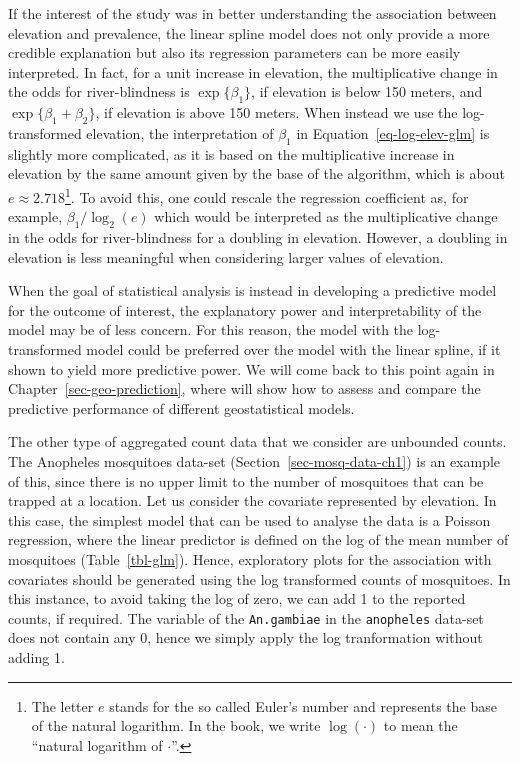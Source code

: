 \documentclass[
  letterpaper,
]{krantz}
\begin{document}
If the interest of the study was in better understanding the association
between elevation and prevalence, the linear spline model does not only
provide a more credible explanation but also its regression parameters
can be more easily interpreted. In fact, for a unit increase in
elevation, the multiplicative change in the odds for river-blindness is
\(\exp\{\beta_1\}\), if elevation is below 150 meters, and
\(\exp\{\beta_1+\beta_2\}\), if elevation is above 150 meters. When
instead we use the log-transformed elevation, the interpretation of
\(\beta_1\) in Equation~\ref{eq-log-elev-glm} is slightly more
complicated, as it is based on the multiplicative increase in elevation
by the same amount given by the base of the algorithm, which is about
\(e \approx 2.718\)\footnote{The letter \(e\) stands for the so called
  Euler's number and represents the base of the natural logarithm. In
  the book, we write \(\log(\cdot)\) to mean the ``natural logarithm of
  \(\cdot\)''.}. To avoid this, one could rescale the regression
coefficient as, for example, \(\beta_1/\log_{2}(e)\) which would be
interpreted as the multiplicative change in the odds for river-blindness
for a doubling in elevation. However, a doubling in elevation is less
meaningful when considering larger values of elevation.

When the goal of statistical analysis is instead in developing a
predictive model for the outcome of interest, the explanatory power and
interpretability of the model may be of less concern. For this reason,
the model with the log-transformed model could be preferred over the
model with the linear spline, if it shown to yield more predictive
power. We will come back to this point again in
Chapter~\ref{sec-geo-prediction}, where will show how to assess and
compare the predictive performance of different geostatistical models.

The other type of aggregated count data that we consider are unbounded
counts. The Anopheles mosquitoes data-set
(Section~\ref{sec-mosq-data-ch1}) is an example of this, since there is
no upper limit to the number of mosquitoes that can be trapped at a
location. Let us consider the covariate represented by elevation. In
this case, the simplest model that can be used to analyse the data is a
Poisson regression, where the linear predictor is defined on the log of
the mean number of mosquitoes (Table~\ref{tbl-glm}). Hence, exploratory
plots for the association with covariates should be generated using the
log transformed counts of mosquitoes. In this instance, to avoid taking
the log of zero, we can add 1 to the reported counts, if required. The
variable of the \texttt{An.gambiae} in the \texttt{anopheles} data-set
does not contain any 0, hence we simply apply the log tranformation
without adding 1.
\end{document}
